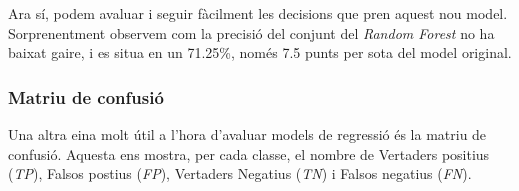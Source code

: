 \documentclass[11pt]{article}
\begin{document}
    Ara sí, podem avaluar i seguir fàcilment les decisions que pren aquest
nou model. Sorprenentment observem com la precisió del conjunt del
\emph{Random Forest} no ha baixat gaire, i es situa en un 71.25\%, només
7.5 punts per sota del model original.

    \hypertarget{matriu-de-confusiuxf3}{%
\subsubsection{Matriu de confusió}\label{matriu-de-confusiuxf3}}

Una altra eina molt útil a l'hora d'avaluar models de regressió és la
matriu de confusió. Aquesta ens mostra, per cada classe, el nombre de
Vertaders positius (\emph{TP}), Falsos postius (\emph{FP}), Vertaders
Negatius (\emph{TN}) i Falsos negatius (\emph{FN}).
\end{document}
